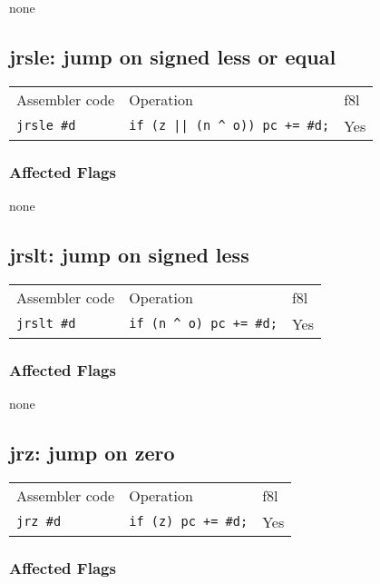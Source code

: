 \documentclass{book}
\begin{document}
none

\subsection{jrsle: jump on signed less or equal}

\begin{tabular}{l l l}
Assembler code   & Operation                                  & f8l \\
\texttt{jrsle \#d} & \texttt{if (z || (n \^{} o)) pc += \#d;} & Yes \\
\end{tabular}

\subsubsection*{Affected Flags}

none


\subsection{jrslt: jump on signed less}

\begin{tabular}{l l l}
Assembler code     & Operation                         & f8l \\
\texttt{jrslt \#d} & \texttt{if (n \^{} o) pc += \#d;} & Yes \\
\end{tabular}

\subsubsection*{Affected Flags}

none


\subsection{jrz: jump on zero}

\begin{tabular}{l l l}
Assembler code   & Operation                  & f8l \\
\texttt{jrz \#d} & \texttt{if (z) pc += \#d;} & Yes \\
\end{tabular}

\subsubsection*{Affected Flags}
\end{document}
